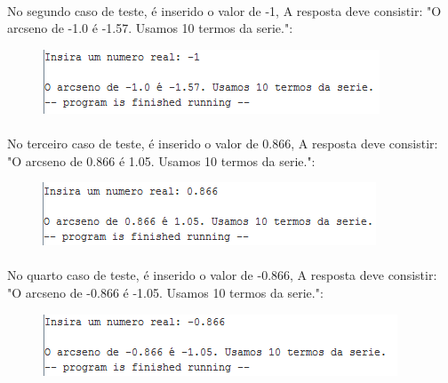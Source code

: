 \documentclass[a4paper, 12pt]{article}
\begin{document}
        \paragraph{}    No segundo caso de teste, \'e inserido o valor de -1, A resposta deve consistir: "O arcseno de -1.0 \'e -1.57. Usamos 10 termos da serie.":
        \begin{figure}[H]
        	\centering
        	\includegraphics[scale=0.8]{img6.png}
		\end{figure}
		\paragraph{}     No terceiro caso de teste, \'e inserido o valor de 0.866, A resposta deve consistir: "O arcseno de 0.866 \'e 1.05. Usamos 10 termos da serie.":
        \begin{figure}[H]
        	\centering
        	\includegraphics[scale=0.8]{img7.png}
        \end{figure}
        \paragraph{}    No quarto caso de teste, \'e inserido o valor de -0.866, A resposta deve consistir: "O arcseno de -0.866 \'e -1.05. Usamos 10 termos da serie.":
        \begin{figure}[H]
        	\centering
        	\includegraphics[scale=0.8]{img8.png}
		\end{figure}
		
        \paragraph{}    
\end{document}
